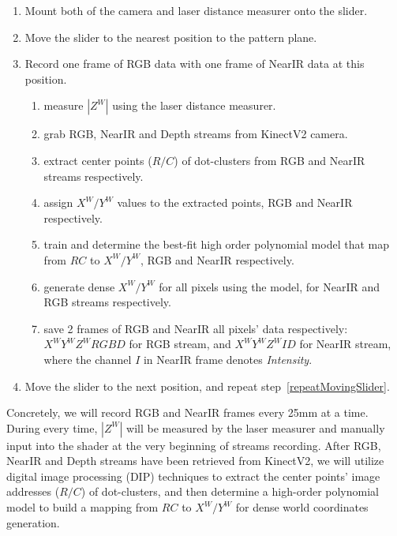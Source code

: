 \begin{enumerate}
   	\item Mount both of the camera and laser distance measurer onto the slider.
   	\item Move the slider to the nearest position to the pattern plane.
   	\item Record one frame of RGB data with one frame of NearIR data at this position.
   	\label{repeatMovingSlider}
   	\begin{enumerate}
     		\item measure \(|Z^W|\) using the laser distance measurer.
     		\item grab RGB, NearIR and Depth streams from KinectV2 camera.
     		\item extract center points (\(R/C\)) of dot-clusters from RGB and NearIR streams respectively.
     		\item assign \(X^W/Y^W\) values to the extracted points, RGB and NearIR respectively.
     		\item train and determine the best-fit high order polynomial model that map from \(RC\) to \(X^W/Y^W\), RGB and NearIR respectively.
     		\item generate dense \(X^W/Y^W\) for all pixels using the model, for NearIR and RGB streams respectively.
     		\item save 2 frames of RGB and NearIR all pixels' data respectively: \(X^WY^WZ^WRGBD\) for RGB stream, and \(X^WY^WZ^WID\) for NearIR stream, where the channel \(I\) in NearIR frame denotes \emph{Intensity}.
   	\end{enumerate}
	\item Move the slider to the next position, and repeat step~\ref{repeatMovingSlider}.
\end{enumerate}
%
Concretely, we will record RGB and NearIR frames every 25mm at a time. During every time, \(|Z^W|\) will be measured by the laser measurer and manually input into the shader at the very beginning of streams recording. After RGB, NearIR and Depth streams have been retrieved from KinectV2, we will utilize digital image processing (DIP) techniques to extract the center points' image addresses (\(R/C\)) of dot-clusters, and then determine a high-order polynomial model to build a mapping from \(RC\) to \(X^W/Y^W\) for dense world coordinates generation.

